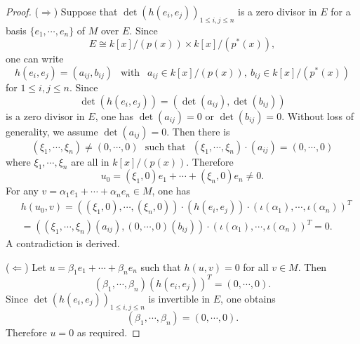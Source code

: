 \documentclass[12pt]{amsart}
\begin{document}
\begin{proof} ($\Rightarrow$) Suppose that $\det(h(e_i, e_j))_{1\leq i, j \leq n}$ is a zero divisor in $E$ for a basis $\{ e_1, \cdots, e_n \}$ of $M$ over $E$.  Since 
$$ E\cong k[x]/(p(x)) \times k[x]/(p^*(x)) , $$
one can write $$h(e_i, e_j)= (a_{ij}, b_{i j}) \ \ \text{ with } \ \ a_{ij}\in k[x]/(p(x)), \ b_{ij} \in  k[x]/(p^*(x))$$ for $1\leq i, j\leq n$. Since
$$\det(h(e_i, e_j))= (\det(a_{ij}), \det(b_{ij})) $$ is a zero divisor in $E$, one has $\det(a_{ij})=0$ or $\det(b_{ij})=0$. Without loss of generality, we assume $\det(a_{ij})=0$. Then  
there is $$(\xi_1, \cdots, \xi_n) \neq (0, \cdots, 0) \ \ \ \text{such that} \ \ \ (\xi_1, \cdots, \xi_n) \cdot (a_{ij}) = (0, \cdots, 0)$$ where $\xi_1, \cdots, \xi_n$ are all in $k[x]/(p(x))$.  Therefore
$$ u_0 = (\xi_1, 0) e_1 + \cdots + (\xi_n, 0) e_n  \neq 0. $$
For any $v= \alpha_1 e_1+ \cdots + \alpha_n e_n \in M$, one has 
$$ \begin{aligned} & h(u_0, v)  = ((\xi_1, 0), \cdots, (\xi_n, 0)) \cdot (h(e_i, e_j)) \cdot (\iota(\alpha_1), \cdots, \iota(\alpha_n))^{T} \\
& = ((\xi_1, \cdots, \xi_n)(a_{ij}), (0, \cdots, 0) (b_{ij}))\cdot (\iota(\alpha_1), \cdots, \iota(\alpha_n))^{T} =0 .
\end{aligned}$$ 
A contradiction is derived. 

($\Leftarrow$) Let $u=\beta_1 e_1+ \cdots + \beta_n e_n$ such that $h(u, v)=0$ for all $v\in M$. 
Then 
$$ (\beta_1, \cdots, \beta_n) (h(e_i, e_j))^T = (0, \cdots, 0) .$$ Since $\det(h(e_i, e_j))_{1\leq i, j \leq n}$ is invertible in $E$, one obtains  $$(\beta_1, \cdots, \beta_n) = (0, \cdots, 0) . $$ Therefore $u=0$ as required. 
\end{proof} 



\end{document}
